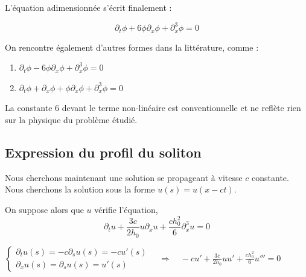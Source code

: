 \begin{remarkbox}
\begin{remark}
    L'équation adimensionnée s'écrit finalement :

    $$\partial_t \phi + 6 \phi \partial_x \phi + \partial_x^3 \phi = 0$$



    On rencontre également d'autres formes dans la littérature, comme :
    \begin{enumerate}
        \item $\partial_t \phi - 6\phi \partial_x \phi + \partial_x^3 \phi = 0$
        \item $\partial_t \phi + \partial_x\phi + \phi\partial_x\phi + \partial_x^3\phi = 0$
    \end{enumerate}

    La constante 6 devant le terme non-linéaire est conventionnelle et ne reflète rien sur la physique du problème étudié.
    
\end{remark}
\end{remarkbox}

\subsection{Expression du profil du soliton}

Nous cherchons maintenant une solution se propageant à vitesse $c$ constante. Nous cherchons la solution sous la forme $u(s) = u(x - ct)$.\cite{soliton}

On suppose alors que $u$ vérifie l'équation,
$$\partial_t u + \frac{3c}{2h_0}u \partial_xu + \frac{ch_0^2}{6}\partial_x^3u = 0$$

$\begin{cases}
    \partial_t u(s) = -c \partial_s u(s) = - c u'(s) \\
    \partial_x u(s) = \partial_su(s) = u'(s)
\end{cases} \quad  \Rightarrow \quad -cu' + \frac{3c}{2h_0}uu' + \frac{ch_0^2}{6}u''' = 0$

